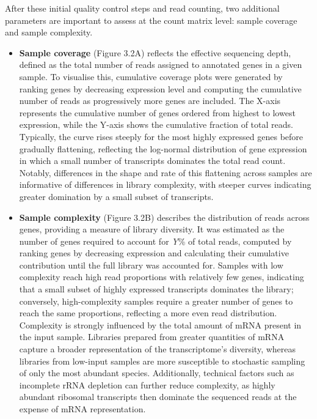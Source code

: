 After these initial quality control steps and read counting, two additional parameters are important to assess at the count matrix level: sample coverage and sample complexity. 
\begin{itemize}
\item \textbf{Sample coverage} (Figure 3.2A) reflects the effective sequencing depth, defined as the total number of reads assigned to annotated genes in a given sample\cite{costa_uncovering_2010}. To visualise this, cumulative coverage plots were generated by ranking genes by decreasing expression level and computing the cumulative number of reads as progressively more genes are included. The X-axis represents the cumulative number of genes ordered from highest to lowest expression, while the Y-axis shows the cumulative fraction of total reads. Typically, the curve rises steeply for the most highly expressed genes before gradually flattening, reflecting the log-normal distribution of gene expression in which a small number of transcripts dominates the total read count. Notably, differences in the shape and rate of this flattening across samples are informative of differences in library complexity, with steeper curves indicating greater domination by a small subset of transcripts.

\item \textbf{Sample complexity} (Figure 3.2B) describes the distribution of reads across genes, providing a measure of library diversity\cite{costa_uncovering_2010}. It was estimated as the number of genes required to account for \textit{Y}\% of total reads, computed by ranking genes by decreasing expression and calculating their cumulative contribution until the full library was accounted for. Samples with low complexity reach high read proportions with relatively few genes, indicating that a small subset of highly expressed transcripts dominates the library; conversely, high-complexity samples require a greater number of genes to reach the same proportions, reflecting a more even read distribution. Complexity is strongly influenced by the total amount of mRNA present in the input sample. Libraries prepared from greater quantities of mRNA capture a broader representation of the transcriptome's diversity, whereas libraries from low-input samples are more susceptible to stochastic sampling of only the most abundant species. Additionally, technical factors such as incomplete rRNA depletion can further reduce complexity, as highly abundant ribosomal transcripts then dominate the sequenced reads at the expense of mRNA representation\cite{costa_uncovering_2010}.
\end{itemize}
